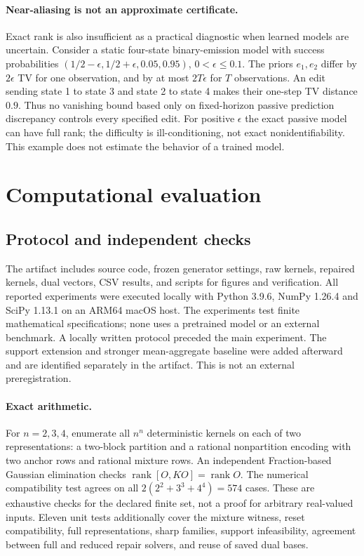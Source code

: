 \documentclass[11pt,letterpaper]{article}
\newcommand{\rank}{\operatorname{rank}}
\begin{document}
\paragraph{Near-aliasing is not an approximate certificate.}
Exact rank is also insufficient as a practical diagnostic when learned models are uncertain. Consider a static four-state binary-emission model with success probabilities $(1/2-\epsilon,1/2+\epsilon,0.05,0.95)$, $0<\epsilon\le0.1$. The priors $e_1,e_2$ differ by $2\epsilon$ TV for one observation, and by at most $2T\epsilon$ for $T$ observations. An edit sending state 1 to state 3 and state 2 to state 4 makes their one-step TV distance $0.9$. Thus no vanishing bound based only on fixed-horizon passive prediction discrepancy controls every specified edit. For positive $\epsilon$ the exact passive model can have full rank; the difficulty is ill-conditioning, not exact nonidentifiability. This example does not estimate the behavior of a trained model.

\section{Computational evaluation}\label{sec:experiments}
\subsection{Protocol and independent checks}
The artifact includes source code, frozen generator settings, raw kernels, repaired kernels, dual vectors, CSV results, and scripts for figures and verification. All reported experiments were executed locally with Python 3.9.6, NumPy 1.26.4 and SciPy 1.13.1 on an ARM64 macOS host. The experiments test finite mathematical specifications; none uses a pretrained model or an external benchmark. A locally written protocol preceded the main experiment. The support extension and stronger mean-aggregate baseline were added afterward and are identified separately in the artifact. This is not an external preregistration.

\paragraph{Exact arithmetic.}
For $n=2,3,4$, enumerate all $n^n$ deterministic kernels on each of two representations: a two-block partition and a rational nonpartition encoding with two anchor rows and rational mixture rows. An independent Fraction-based Gaussian elimination checks
$\rank[O,KO]=\rank O$.
The numerical compatibility test agrees on all $2(2^2+3^3+4^4)=574$ cases. These are exhaustive checks for the declared finite set, not a proof for arbitrary real-valued inputs. Eleven unit tests additionally cover the mixture witness, reset compatibility, full representations, sharp families, support infeasibility, agreement between full and reduced repair solvers, and reuse of saved dual bases.
\end{document}
